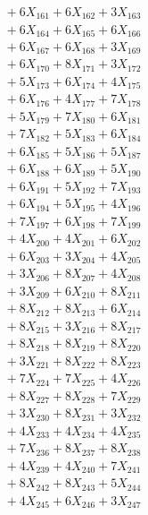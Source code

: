 \documentclass[a4paper,10pt]{article}
\begin{document}
{\begin{align}
&\;  + 6 X_{161} + 6 X_{162} + 3 X_{163} \\[0.3ex]
&\;  + 6 X_{164} + 6 X_{165} + 6 X_{166} \\[0.3ex]
&\;  + 6 X_{167} + 6 X_{168} + 3 X_{169} \\[0.3ex]
&\;  + 6 X_{170} + 8 X_{171} + 3 X_{172} \\[0.3ex]
&\;  + 5 X_{173} + 6 X_{174} + 4 X_{175} \\[0.3ex]
&\;  + 6 X_{176} + 4 X_{177} + 7 X_{178} \\[0.3ex]
&\;  + 5 X_{179} + 7 X_{180} + 6 X_{181} \\[0.3ex]
&\;  + 7 X_{182} + 5 X_{183} + 6 X_{184} \\[0.3ex]
&\;  + 6 X_{185} + 5 X_{186} + 5 X_{187} \\[0.3ex]
&\;  + 6 X_{188} + 6 X_{189} + 5 X_{190} \\[0.5ex]\allowbreak
&\;  + 6 X_{191} + 5 X_{192} + 7 X_{193} \\[0.3ex]
&\;  + 6 X_{194} + 5 X_{195} + 4 X_{196} \\[0.3ex]
&\;  + 7 X_{197} + 6 X_{198} + 7 X_{199} \\[0.3ex]
&\;  + 4 X_{200} + 4 X_{201} + 6 X_{202} \\[0.3ex]
&\;  + 6 X_{203} + 3 X_{204} + 4 X_{205} \\[0.3ex]
&\;  + 3 X_{206} + 8 X_{207} + 4 X_{208} \\[0.3ex]
&\;  + 3 X_{209} + 6 X_{210} + 8 X_{211} \\[0.3ex]
&\;  + 8 X_{212} + 8 X_{213} + 6 X_{214} \\[0.3ex]
&\;  + 8 X_{215} + 3 X_{216} + 8 X_{217} \\[0.3ex]
&\;  + 8 X_{218} + 8 X_{219} + 8 X_{220} \\[0.5ex]\allowbreak
&\;  + 3 X_{221} + 8 X_{222} + 8 X_{223} \\[0.3ex]
&\;  + 7 X_{224} + 7 X_{225} + 4 X_{226} \\[0.3ex]
&\;  + 8 X_{227} + 8 X_{228} + 7 X_{229} \\[0.3ex]
&\;  + 3 X_{230} + 8 X_{231} + 3 X_{232} \\[0.3ex]
&\;  + 4 X_{233} + 4 X_{234} + 4 X_{235} \\[0.3ex]
&\;  + 7 X_{236} + 8 X_{237} + 8 X_{238} \\[0.3ex]
&\;  + 4 X_{239} + 4 X_{240} + 7 X_{241} \\[0.3ex]
&\;  + 8 X_{242} + 8 X_{243} + 5 X_{244} \\[0.3ex]
&\;  + 4 X_{245} + 6 X_{246} + 3 X_{247} \\[0.3ex]

\end{align}}
\end{document}
